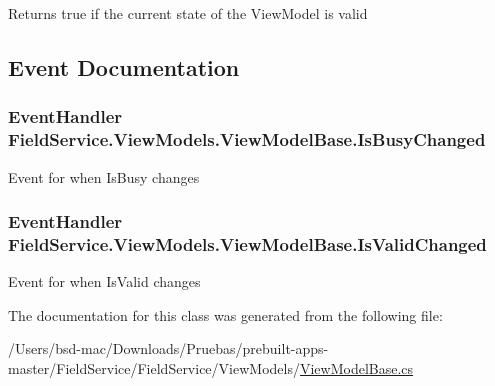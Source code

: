 Returns true if the current state of the View\+Model is valid 



\subsection{Event Documentation}
\hypertarget{class_field_service_1_1_view_models_1_1_view_model_base_a358450ebfc5f259f34a81ee8184ad1c2}{
\subsubsection[{Is\+Busy\+Changed}]{\setlength{\rightskip}{0pt plus 5cm}Event\+Handler Field\+Service.\+View\+Models.\+View\+Model\+Base.\+Is\+Busy\+Changed}}\label{class_field_service_1_1_view_models_1_1_view_model_base_a358450ebfc5f259f34a81ee8184ad1c2}


Event for when Is\+Busy changes 

\hypertarget{class_field_service_1_1_view_models_1_1_view_model_base_af6a683e5a53bba62a459ce847680c1a8}{
\subsubsection[{Is\+Valid\+Changed}]{\setlength{\rightskip}{0pt plus 5cm}Event\+Handler Field\+Service.\+View\+Models.\+View\+Model\+Base.\+Is\+Valid\+Changed}}\label{class_field_service_1_1_view_models_1_1_view_model_base_af6a683e5a53bba62a459ce847680c1a8}


Event for when Is\+Valid changes 



The documentation for this class was generated from the following file\+:\begin{DoxyCompactItemize}
\item 
/\+Users/bsd-\/mac/\+Downloads/\+Pruebas/prebuilt-\/apps-\/master/\+Field\+Service/\+Field\+Service/\+View\+Models/\hyperlink{_view_model_base_8cs}{View\+Model\+Base.\+cs}\end{DoxyCompactItemize}
